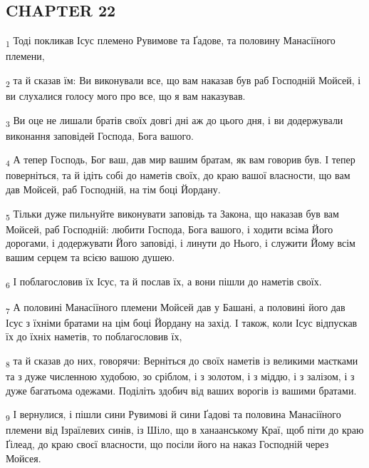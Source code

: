 \subsection{CHAPTER 22}
\begin{tcolorbox}
\textsubscript{1} Тоді покликав Ісус племено Рувимове та Ґадове, та половину Манасіїного племени,
\end{tcolorbox}
\begin{tcolorbox}
\textsubscript{2} та й сказав їм: Ви виконували все, що вам наказав був раб Господній Мойсей, і ви слухалися голосу мого про все, що я вам наказував.
\end{tcolorbox}
\begin{tcolorbox}
\textsubscript{3} Ви оце не лишали братів своїх довгі дні аж до цього дня, і ви додержували виконання заповідей Господа, Бога вашого.
\end{tcolorbox}
\begin{tcolorbox}
\textsubscript{4} А тепер Господь, Бог ваш, дав мир вашим братам, як вам говорив був. І тепер поверніться, та й ідіть собі до наметів своїх, до краю вашої власности, що вам дав Мойсей, раб Господній, на тім боці Йордану.
\end{tcolorbox}
\begin{tcolorbox}
\textsubscript{5} Тільки дуже пильнуйте виконувати заповідь та Закона, що наказав був вам Мойсей, раб Господній: любити Господа, Бога вашого, і ходити всіма Його дорогами, і додержувати Його заповіді, і линути до Нього, і служити Йому всім вашим серцем та всією вашою душею.
\end{tcolorbox}
\begin{tcolorbox}
\textsubscript{6} І поблагословив їх Ісус, та й послав їх, а вони пішли до наметів своїх.
\end{tcolorbox}
\begin{tcolorbox}
\textsubscript{7} А половині Манасіїного племени Мойсей дав у Башані, а половині його дав Ісус з їхніми братами на цім боці Йордану на захід. І також, коли Ісус відпускав їх до їхніх наметів, то поблагословив їх,
\end{tcolorbox}
\begin{tcolorbox}
\textsubscript{8} та й сказав до них, говорячи: Верніться до своїх наметів із великими маєтками та з дуже численною худобою, зо сріблом, і з золотом, і з міддю, і з залізом, і з дуже багатьома одежами. Поділіть здобич від ваших ворогів із вашими братами.
\end{tcolorbox}
\begin{tcolorbox}
\textsubscript{9} І вернулися, і пішли сини Рувимові й сини Ґадові та половина Манасіїного племени від Ізраїлевих синів, із Шіло, що в ханаанському Краї, щоб піти до краю Ґілеад, до краю своєї власности, що посіли його на наказ Господній через Мойсея.
\end{tcolorbox}
